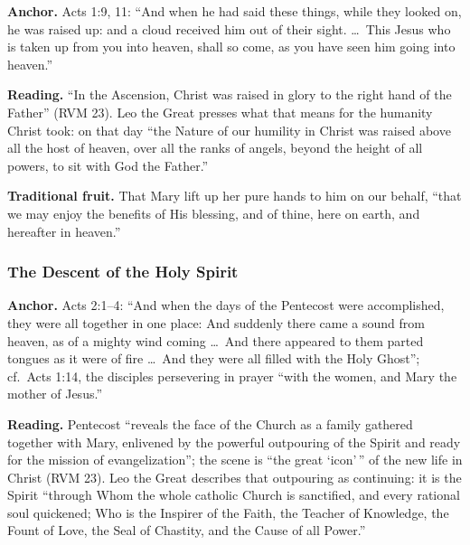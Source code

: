 \textbf{Anchor.} Acts 1:9, 11: ``And when he had said these things,
while they looked on, he was raised up: and a cloud received him out of
their sight. \ldots\ This Jesus who is taken up from you into heaven,
shall so come, as you have seen him going into heaven.''

\textbf{Reading.} ``In the Ascension, Christ was raised in glory to the
right hand of the Father'' (RVM 23). Leo the Great presses what that
means for the humanity Christ took: on that day ``the Nature of our
humility in Christ was raised above all the host of heaven, over all the
ranks of angels, beyond the height of all powers, to sit with God the
Father.''

\textbf{Traditional fruit.} That Mary lift up her pure hands to him on
our behalf, ``that we may enjoy the benefits of His blessing, and of
thine, here on earth, and hereafter in heaven.''

\subsubsection{The Descent of the Holy Spirit}

\textbf{Anchor.} Acts 2:1--4: ``And when the days of the Pentecost were
accomplished, they were all together in one place: And suddenly there
came a sound from heaven, as of a mighty wind coming \ldots\ And there
appeared to them parted tongues as it were of fire \ldots\ And they were
all filled with the Holy Ghost''; cf.\ Acts 1:14, the disciples
persevering in prayer ``with the women, and Mary the mother of Jesus.''

\textbf{Reading.} Pentecost ``reveals the face of the Church as a family
gathered together with Mary, enlivened by the powerful outpouring of the
Spirit and ready for the mission of evangelization''; the scene is
``the great `icon'\,'' of the new life in Christ (RVM 23). Leo the Great
describes that outpouring as continuing: it is the Spirit ``through Whom
the whole catholic Church is sanctified, and every rational soul
quickened; Who is the Inspirer of the Faith, the Teacher of Knowledge,
the Fount of Love, the Seal of Chastity, and the Cause of all
Power.''

